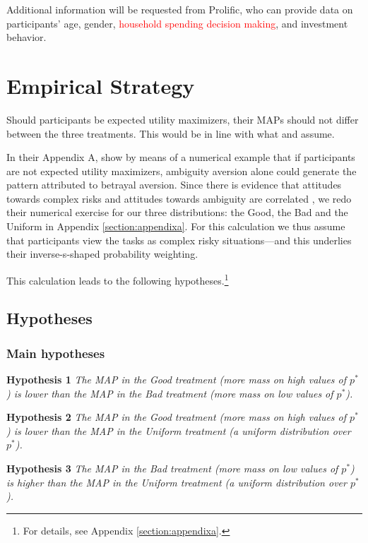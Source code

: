 Additional information will be requested from Prolific, who can provide data on participants' age, gender, \textcolor{red}{household spending decision making}, and investment behavior.




\section{Empirical Strategy}
Should participants be expected utility maximizers, their MAPs should not differ between the three treatments.
This would be in line with what \cite{Bohnet2004} and \cite{Bohnet2008} assume.

In their Appendix A, \cite{Li2020a} show by means of a numerical example that if participants are not expected utility maximizers, ambiguity aversion alone could generate the pattern attributed to betrayal aversion.
Since there is evidence that attitudes towards complex risks and attitudes towards ambiguity are correlated \citep{Armantier2016}, we redo their numerical exercise for our three distributions: the Good, the Bad and the Uniform in Appendix \ref{section:appendixa}.
For this calculation we thus assume that participants view the tasks as complex risky situations---and this underlies their inverse-s-shaped probability weighting.

This calculation leads to the following hypotheses.\footnote{
For details, see Appendix \ref{section:appendixa}.
}


\subsection{Hypotheses}
\subsubsection{Main hypotheses}
\noindent \textbf{Hypothesis 1} \quad \textit{The MAP in the Good treatment (more mass on high values of $p^*$) is lower than the MAP in the Bad treatment (more mass on low values of $p^*$).}

\noindent \textbf{Hypothesis 2} \quad \textit{The MAP in the Good treatment (more mass on high values of $p^*$) is lower than the MAP in the Uniform treatment (a uniform distribution over $p^*$).}

\noindent \textbf{Hypothesis 3} \quad \textit{The MAP in the Bad treatment (more mass on low values of $p^*$) is higher than the MAP in the Uniform treatment (a uniform distribution over $p^*$).}


